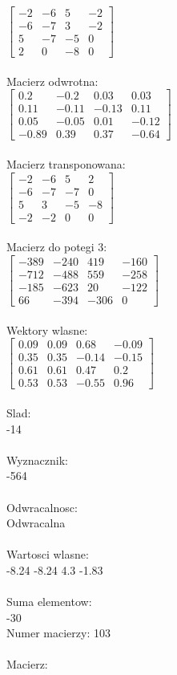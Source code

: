 \documentclass[a4paper,12pt]{article}
\begin{document}
$\begin{bmatrix} -2&-6&5&-2\\-6&-7&3&-2\\5&-7&-5&0\\2&0&-8&0 \end{bmatrix}$
\\
\\
Macierz odwrotna:\\

$\begin{bmatrix} 0.2&-0.2&0.03&0.03\\0.11&-0.11&-0.13&0.11\\0.05&-0.05&0.01&-0.12\\-0.89&0.39&0.37&-0.64 \end{bmatrix}$
\\
\\
Macierz transponowana:\\

$\begin{bmatrix} -2&-6&5&2\\-6&-7&-7&0\\5&3&-5&-8\\-2&-2&0&0 \end{bmatrix}$
\\
\\
Macierz do potegi 3:\\

$\begin{bmatrix} -389&-240&419&-160\\-712&-488&559&-258\\-185&-623&20&-122\\66&-394&-306&0 \end{bmatrix}$
\\
\\
Wektory wlasne:\\

$\begin{bmatrix} 0.09&0.09&0.68&-0.09\\0.35&0.35&-0.14&-0.15\\0.61&0.61&0.47&0.2\\0.53&0.53&-0.55&0.96 \end{bmatrix}$
\\
\\
Slad:\\
-14
\\
\\
Wyznacznik:\\
-564
\\
\\
Odwracalnosc:\\
Odwracalna
\\
\\
Wartosci wlasne:\\
-8.24 -8.24 4.3 -1.83
\\
\\
Suma elementow:\\
-30
\\
\newpage
Numer macierzy:
103
\\
\\
Macierz:\\
\end{document}
